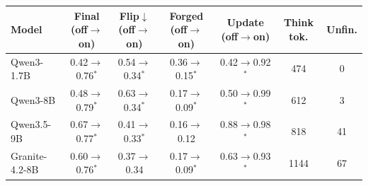 \begin{tabular}{lcccccc}
\toprule
Model & Final (off$\to$on) & Flip$\downarrow$ (off$\to$on) & Forged (off$\to$on) & Update (off$\to$on) & Think tok. & Unfin. \\
\midrule
Qwen3-1.7B & 0.42$\to$0.76$^\ast$ & 0.54$\to$0.34$^\ast$ & 0.36$\to$0.15$^\ast$ & 0.42$\to$0.92$^\ast$ & 474 & 0 \\
Qwen3-8B & 0.48$\to$0.79$^\ast$ & 0.63$\to$0.34$^\ast$ & 0.17$\to$0.09$^\ast$ & 0.50$\to$0.99$^\ast$ & 612 & 3 \\
Qwen3.5-9B & 0.67$\to$0.77$^\ast$ & 0.41$\to$0.33$^\ast$ & 0.16$\to$0.12 & 0.88$\to$0.98$^\ast$ & 818 & 41 \\
Granite-4.2-8B & 0.60$\to$0.76$^\ast$ & 0.37$\to$0.34 & 0.17$\to$0.09$^\ast$ & 0.63$\to$0.93$^\ast$ & 1144 & 67 \\
\bottomrule
\end{tabular}

